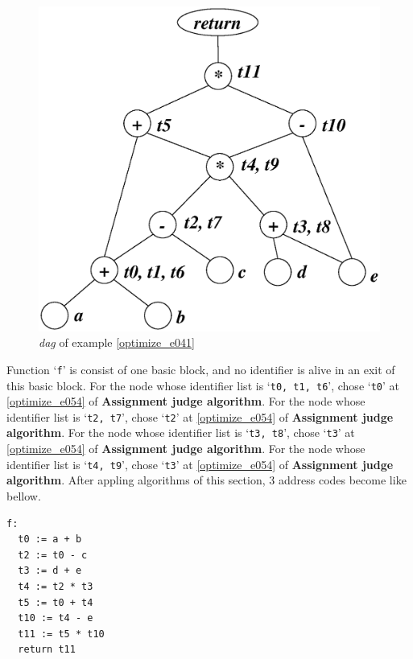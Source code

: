 \begin{Example}
\begin{figure}[htbp]
\begin{center}
\begin{latexonly}
\includegraphics[width=1.051\linewidth,height=1.0\linewidth]{opt022.eps}
\end{latexonly}
\caption{{\em dag} of example \ref{optimize_e041}}
\label{optimize_e042}
\end{center}
\end{figure}
Function `{\tt{f}}' is consist of one basic block, and 
no identifier is alive in an exit of this basic block.
For the node whose identifier list is `{\tt{t0, t1, t6}}',
chose `{\tt{t0}}' at \ref{optimize_e054}
of {\bf Assignment judge algorithm}.
For the node whose identifier list is `{\tt{t2, t7}}',
chose `{\tt{t2}}' at \ref{optimize_e054}
of {\bf Assignment judge algorithm}.
For the node whose identifier list is `{\tt{t3, t8}}',
chose `{\tt{t3}}' at \ref{optimize_e054}
of {\bf Assignment judge algorithm}.
For the node whose identifier list is `{\tt{t4, t9}}',
chose `{\tt{t3}}' at \ref{optimize_e054}
of {\bf Assignment judge algorithm}.
After appling algorithms of this section,
3 address codes become like bellow.
\begin{verbatim}
f:
  t0 := a + b
  t2 := t0 - c
  t3 := d + e
  t4 := t2 * t3
  t5 := t0 + t4
  t10 := t4 - e
  t11 := t5 * t10
  return t11
\end{verbatim}
\end{Example}

